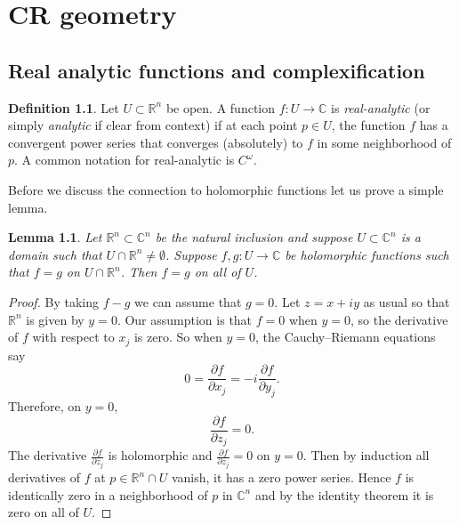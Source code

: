 \documentclass[12pt,openany]{book}
\newcommand{\C}{{\mathbb{C}}}
\newcommand{\R}{{\mathbb{R}}}
\newcommand{\myindex}[1]{#1\index{#1}}
\theoremstyle{plain}
\newtheorem{lemma}[thm]{Lemma}
\theoremstyle{remark}
\theoremstyle{definition}
\newtheorem{defn}[thm]{Definition}
\theoremstyle{exercise}
\theoremstyle{example}
\begin{document}

\chapter{CR geometry} \label{ch:crgeometry}


\section{Real analytic functions and complexification}

\begin{defn}
Let $U \subset \R^n$ be open.
A function $f \colon U \to \C$ is 
\emph{\myindex{real-analytic}} (or simply \emph{analytic} if
clear from context) if at each point $p \in U$, the function $f$
has a convergent power series that converges (absolutely) to $f$ in some
neighborhood of $p$.
%
A common notation for real-analytic is $C^\omega$.
\end{defn}

Before we discuss the connection to holomorphic functions let us prove a simple
lemma.

\begin{lemma}
Let $\R^n \subset \C^n$ be the natural inclusion and suppose
$U \subset \C^n$ is a domain such that $U \cap \R^n \not= \emptyset$.
Suppose $f,g \colon U \to \C$ be holomorphic functions such that
$f=g$ on $U \cap \R^n$.  Then $f=g$ on all of $U$.
\end{lemma}

\begin{proof}
By taking $f-g$ we can assume that $g=0$.
Let $z = x+iy$ as usual so that $\R^n$ is given by $y=0$.
Our assumption is that $f = 0$ when $y=0$,
so the derivative of $f$ with respect to $x_j$ is zero.
So when $y=0$,
the Cauchy--Riemann equations say
\begin{equation*}
0 = \frac{\partial f}{\partial x_j} =
-i \frac{\partial f}{\partial y_j} .
\end{equation*}
Therefore, on $y=0$,
\begin{equation*}
\frac{\partial f }{\partial z_j} = 0 .
\end{equation*}
The derivative $\frac{\partial f }{\partial z_j}$ is holomorphic
and $\frac{\partial f }{\partial z_j} = 0$ on $y=0$.  Then
by induction all derivatives of $f$ at $p \in \R^n \cap U$ vanish, it has a zero 
power series.  Hence $f$ is identically zero in a neighborhood of
$p$ in $\C^n$ and by the identity theorem it is zero on all of $U$.
\end{proof}
\end{document}
